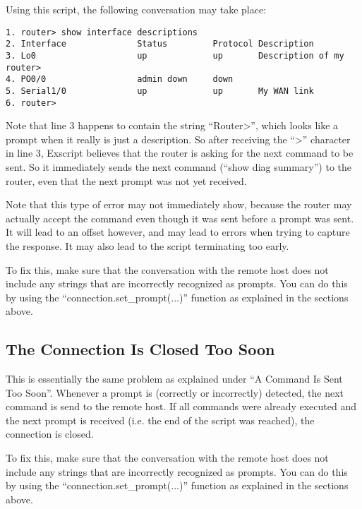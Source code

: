 Using this script, the following conversation may take place:

\begin{lstlisting}
1. router> show interface descriptions
2. Interface              Status         Protocol Description
3. Lo0                    up             up       Description of my router>
4. PO0/0                  admin down     down     
5. Serial1/0              up             up       My WAN link
6. router> 
\end{lstlisting}

Note that line 3 happens to contain the string ``Router>'', which looks like 
a prompt when it really is just a description. So after receiving the ``>'' 
character in line 3, Exscript believes that the router is asking for the 
next command to be sent. So it immediately sends the next command (``show 
diag summary'') to the router, even that the next prompt was not yet received.

Note that this type of error may not immediately show, because the router may 
actually accept the command even though it was sent before a prompt was sent. 
It will lead to an offset however, and may lead to errors when trying to 
capture the response. It may also lead to the script terminating too early.

To fix this, make sure that the conversation with the remote host does 
not include any strings that are incorrectly recognized as prompts. You can 
do this by using the ``connection.set\_prompt(...)'' function as explained 
in the sections above. 


\subsection{The Connection Is Closed Too Soon}

This is essentially the same problem as explained under ``A Command Is Sent 
Too Soon''. Whenever a prompt is (correctly or incorrectly) detected, 
the next command is send to the remote host.
If all commands were already executed and the next prompt is received (i.e. 
the end of the script was reached), the connection is closed.

To fix this, make sure that the conversation with the remote host does 
not include any strings that are incorrectly recognized as prompts. You can 
do this by using the ``connection.set\_prompt(...)'' function as explained 
in the sections above. 

